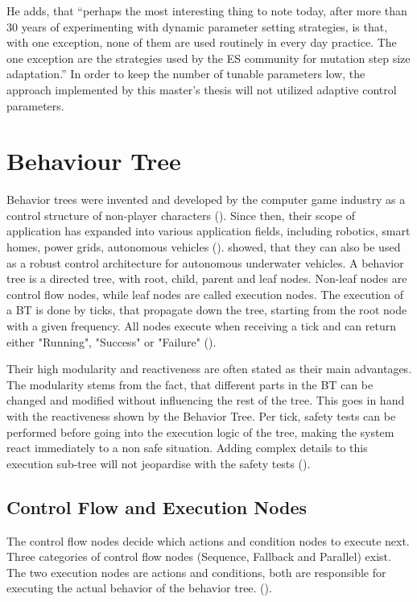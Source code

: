 He adds, that \enquote{perhaps the most interesting thing to note today, after more than 30 years of experimenting with dynamic parameter setting strategies, is that, with one exception, none of them are used routinely in every day practice. The one exception are the strategies used by the ES community for mutation step size adaptation.} In order to keep the number of tunable parameters low, the approach implemented by this master's thesis will not utilized adaptive control parameters.

\section{Behaviour Tree}
Behavior trees were invented and developed by the computer game industry as a control structure of non-player characters (\cite{collendanchise_behavior_2019}). Since then, their scope of application has expanded into various application fields, including robotics, smart homes, power grids, autonomous vehicles (\cite{iovino_survey_2022}). \cite{sprague_improving_2018} showed, that they can also be used as a robust control architecture for autonomous underwater vehicles. A behavior tree is a directed tree, with root, child, parent and leaf nodes. Non-leaf nodes are control flow nodes, while leaf nodes are called execution nodes. The execution of a BT is done by ticks, that propagate down the tree, starting from the root node with a given frequency. All nodes execute when receiving a tick and can return either "Running", "Success" or "Failure" (\cite{collendanchise_behavior_2019}).

Their high modularity and reactiveness are often stated as their main advantages. The modularity stems from the fact, that different parts in the BT can be changed and modified without influencing the rest of the tree. This goes in hand with the reactiveness shown by the Behavior Tree. Per tick, safety tests can be performed before going into the execution logic of the tree, making the system react immediately to a non safe situation. Adding complex details to this execution sub-tree will not jeopardise with the safety tests (\cite{sprague_improving_2018}).

\subsection{Control Flow and Execution Nodes}
The control flow nodes decide which actions and condition nodes to execute next. Three categories of control flow nodes (Sequence, Fallback and Parallel) exist. The two execution nodes are actions and conditions, both are responsible for executing the actual behavior of the behavior tree. (\cite{collendanchise_behavior_2019}).


